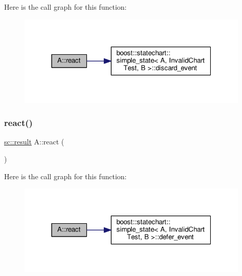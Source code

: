 Here is the call graph for this function\+:
\nopagebreak
\begin{figure}[H]
\begin{center}
\leavevmode
\includegraphics[width=313pt]{struct_a_aeebabda5b0df22ae3c95fb0415135aa6_cgraph}
\end{center}
\end{figure}
\mbox{\label{struct_a_a088ea5e2fe4c12cb13a3151cf040face}} 
\subsubsection{\texorpdfstring{react()}{react()}\hspace{0.1cm}{\footnotesize\ttfamily [8/11]}}
{\footnotesize\ttfamily \mbox{\hyperlink{namespaceboost_1_1statechart_abe807f6598b614d6d87bb951ecd92331}{sc\+::result}} A\+::react (\begin{DoxyParamCaption}\item[{const \mbox{\hyperlink{struct_ev_defer}{Ev\+Defer}} \&}]{ }\end{DoxyParamCaption})\hspace{0.3cm}{\ttfamily [inline]}}

Here is the call graph for this function\+:
\nopagebreak
\begin{figure}[H]
\begin{center}
\leavevmode
\includegraphics[width=313pt]{struct_a_a088ea5e2fe4c12cb13a3151cf040face_cgraph}
\end{center}
\end{figure}
\mbox{\label{struct_a_a43a91cc21bb007d57f7cacb94c9da395}} 

